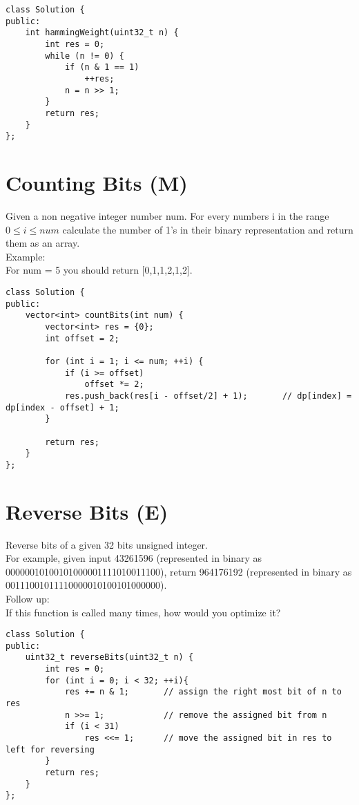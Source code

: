 \begin{lstlisting}
class Solution {
public:
    int hammingWeight(uint32_t n) {
        int res = 0;
        while (n != 0) {
            if (n & 1 == 1)
                ++res;
            n = n >> 1;
        }
        return res;
    }
};
\end{lstlisting}


\section{Counting Bits (M)}
Given a non negative integer number num. For every numbers i in the range $0 \leq i \leq num$ calculate the number of 1's in their binary representation and return them as an array.\\

Example:\\
For num = 5 you should return [0,1,1,2,1,2]. \\

\begin{lstlisting}
class Solution {
public:
    vector<int> countBits(int num) {
        vector<int> res = {0};
        int offset = 2;
        
        for (int i = 1; i <= num; ++i) {                
            if (i >= offset)
                offset *= 2;
            res.push_back(res[i - offset/2] + 1);       // dp[index] = dp[index - offset] + 1;
        }
        
        return res;
    }
};
\end{lstlisting}


\section{Reverse Bits (E)}
Reverse bits of a given 32 bits unsigned integer.\\

For example, given input 43261596 (represented in binary as 00000010100101000001111010011100), return 964176192 (represented in binary as 00111001011110000010100101000000).\\

Follow up:\\
If this function is called many times, how would you optimize it? \\

\begin{lstlisting}
class Solution {
public:
    uint32_t reverseBits(uint32_t n) {
        int res = 0;
        for (int i = 0; i < 32; ++i){
            res += n & 1;       // assign the right most bit of n to res
            n >>= 1;            // remove the assigned bit from n
            if (i < 31)
                res <<= 1;      // move the assigned bit in res to left for reversing
        }
        return res;
    }
};
\end{lstlisting}


